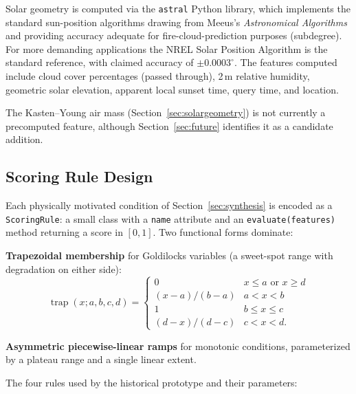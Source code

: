 \documentclass[11pt,a4paper]{article}
\DeclareMathOperator{\trap}{trap}
\begin{document}
Solar geometry is computed via the \texttt{astral} Python library, which implements the standard sun-position algorithms drawing from Meeus's \emph{Astronomical Algorithms} and providing accuracy adequate for fire-cloud-prediction purposes (subdegree). For more demanding applications the NREL Solar Position Algorithm \citep{reda2004spa} is the standard reference, with claimed accuracy of $\pm 0.0003^\circ$. The features computed include cloud cover percentages (passed through), 2\,m relative humidity, geometric solar elevation, apparent local sunset time, query time, and location.

The Kasten--Young air mass (Section~\ref{sec:solargeometry}) is not currently a precomputed feature, although Section~\ref{sec:future} identifies it as a candidate addition.

\subsection{Scoring Rule Design}
\label{sec:rules}

Each physically motivated condition of Section~\ref{sec:synthesis} is encoded as a \texttt{ScoringRule}: a small class with a \texttt{name} attribute and an \texttt{evaluate(features)} method returning a score in $[0, 1]$. Two functional forms dominate:

\textbf{Trapezoidal membership} for Goldilocks variables (a sweet-spot range with degradation on either side):
\begin{equation}
\trap(x; a, b, c, d) = \begin{cases}
0 & x \leq a \text{ or } x \geq d \\
(x-a)/(b-a) & a < x < b \\
1 & b \leq x \leq c \\
(d-x)/(d-c) & c < x < d.
\end{cases}
\label{eq:trapezoid}
\end{equation}

\textbf{Asymmetric piecewise-linear ramps} for monotonic conditions, parameterized by a plateau range and a single linear extent.

The four rules used by the historical prototype and their parameters:
\end{document}
